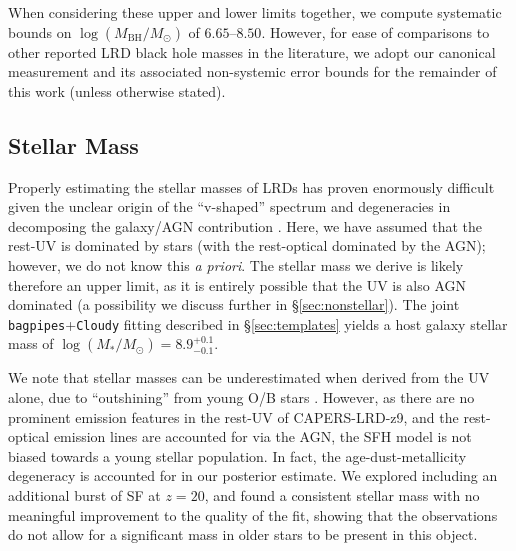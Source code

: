 \documentclass[twocolumn]{aastex7}
\newcommand{\src}{CAPERS-LRD-z9}
\begin{document}
When considering these upper and lower limits together, we compute systematic bounds on $\log(M_\textrm{BH}/M_\odot)$ of $6.65$--$8.50$. However, for ease of comparisons to other reported LRD black hole masses in the literature, we adopt our canonical measurement and its associated non-systemic error bounds for the remainder of this work (unless otherwise stated).  

\subsection{Stellar Mass}\label{sec:stellarmass}

Properly estimating the stellar masses of LRDs has proven enormously difficult given the unclear origin of the ``v-shaped'' spectrum and degeneracies in decomposing the galaxy/AGN contribution \citep[e.g.][]{kokorev23, Barro23, furtak24, wang24a, wang24, akins24, labbe24}. 
Here, we have assumed that the rest-UV is dominated by stars (with the rest-optical dominated by the AGN); however, we do not know this {\it a priori}. 
The stellar mass we derive is likely therefore an upper limit, as it is entirely possible that the UV is also AGN dominated (a possibility we discuss further in \S\ref{sec:nonstellar}). 
The joint \texttt{bagpipes}+\texttt{Cloudy} fitting described in \S\ref{sec:templates} yields a host galaxy stellar mass of $\log(M_*/M_{\odot})=8.9^{+0.1}_{-0.1}$.

We note that stellar masses can be underestimated when derived from the UV alone, due to ``outshining'' from young O/B stars \cite[see e.g.][]{narayanan24}.
However, as there are no prominent emission features in the rest-UV of \src{}, and the rest-optical emission lines are accounted for via the AGN, the SFH model is not biased towards a young stellar population. 
In fact, the age-dust-metallicity degeneracy is accounted for in our posterior estimate. 
We explored including an additional burst of SF at $z=20$, and found a consistent stellar mass with no meaningful improvement to the quality of the fit, showing that the observations do not allow for a significant mass in older stars to be present in this object. 
\end{document}
